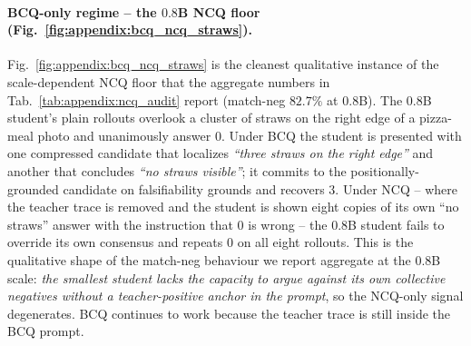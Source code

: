 \paragraph{BCQ-only regime -- the $0.8$B NCQ floor (Fig.~\ref{fig:appendix:bcq_ncq_straws}).}
Fig.~\ref{fig:appendix:bcq_ncq_straws} is the cleanest qualitative instance of the scale-dependent NCQ floor that the aggregate numbers in Tab.~\ref{tab:appendix:ncq_audit} report (match-neg $82.7\%$ at $0.8$B). The $0.8$B student's plain rollouts overlook a cluster of straws on the right edge of a pizza-meal photo and unanimously answer $0$. Under BCQ the student is presented with one compressed candidate that localizes \emph{``three straws on the right edge''} and another that concludes \emph{``no straws visible''}; it commits to the positionally-grounded candidate on falsifiability grounds and recovers $3$. Under NCQ -- where the teacher trace is removed and the student is shown eight copies of its own ``no straws'' answer with the instruction that $0$ is wrong -- the $0.8$B student fails to override its own consensus and repeats $\boxed{0}$ on all eight rollouts. This is the qualitative shape of the match-neg behaviour we report aggregate at the $0.8$B scale: \emph{the smallest student lacks the capacity to argue against its own collective negatives without a teacher-positive anchor in the prompt}, so the NCQ-only signal degenerates. BCQ continues to work because the teacher trace is still inside the BCQ prompt.



